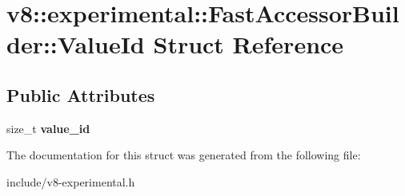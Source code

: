 \hypertarget{structv8_1_1experimental_1_1_fast_accessor_builder_1_1_value_id}{}\section{v8\+:\+:experimental\+:\+:Fast\+Accessor\+Builder\+:\+:Value\+Id Struct Reference}
\label{structv8_1_1experimental_1_1_fast_accessor_builder_1_1_value_id}
\subsection*{Public Attributes}
\begin{DoxyCompactItemize}
\item 
size\+\_\+t {\bfseries value\+\_\+id}\hypertarget{structv8_1_1experimental_1_1_fast_accessor_builder_1_1_value_id_ab344ca323c52a8efce5855a853bffe86}{}\label{structv8_1_1experimental_1_1_fast_accessor_builder_1_1_value_id_ab344ca323c52a8efce5855a853bffe86}

\end{DoxyCompactItemize}


The documentation for this struct was generated from the following file\+:\begin{DoxyCompactItemize}
\item 
include/v8-\/experimental.\+h\end{DoxyCompactItemize}
